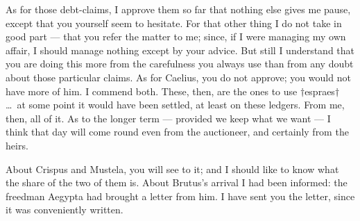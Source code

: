 

 As for those debt-claims, I approve them so far that nothing else gives me pause, except that you yourself seem to hesitate. For that other thing I do not take in good part --- that you refer the matter to me; since, if I were managing my own affair, I should manage nothing except by your advice. But still I understand that you are doing this more from the carefulness you always use than from any doubt about those particular claims. As for Caelius, you do not approve; you would not have more of him. I commend both. These, then, are the ones to use $\dagger$espraes$\dagger$ \dots\ at some point it would have been settled, at least on these ledgers. From me, then, all of it. As to the longer term --- provided we keep what we want --- I think that day will come round even from the auctioneer, and certainly from the heirs.

 About Crispus and Mustela, you will see to it; and I should like to know what the share of the two of them is. About Brutus's arrival I had been informed: the freedman Aegypta had brought a letter from him. I have sent you the letter, since it was conveniently written.
